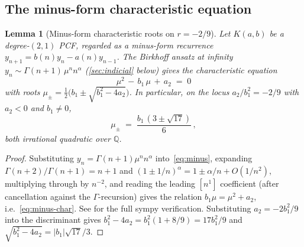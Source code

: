 \documentclass[11pt]{amsart}
\newtheorem{lemma}[theorem]{Lemma}
\theoremstyle{definition}
\theoremstyle{remark}
\newcommand{\Q}{\mathbb{Q}}
\begin{document}
\subsection{The minus-form characteristic equation}

\begin{lemma}[Minus-form characteristic roots on $r=-2/9$]
\label{lem:minus-roots}
Let $K(a,b)$ be a degree-$(2,1)$ PCF, regarded as a minus-form
recurrence $y_{n+1} = b(n)y_n - a(n)y_{n-1}$.  The Birkhoff ansatz at
infinity $y_n \sim \Gamma(n+1)\,\mu^n n^\alpha$
(\textsection\ref{sec:indicial} below) gives the characteristic
equation
\begin{equation}\label{eq:minus-char}
  \mu^2 \,-\, b_1\,\mu \,+\, a_2 \;=\; 0
\end{equation}
with roots $\mu_\pm = \tfrac{1}{2}\bigl(b_1 \pm \sqrt{b_1^2 - 4
a_2}\bigr)$.  In particular, on the locus $a_2/b_1^2 = -2/9$ with
$a_2 < 0$ and $b_1 \ne 0$,
\[
  \mu_\pm \;=\; \frac{b_1\,(3 \pm \sqrt{17})}{6}\,,
\]
both irrational quadratic over $\Q$.
\end{lemma}
\begin{proof}
Substituting $y_n = \Gamma(n+1)\mu^n n^\alpha$ into~\eqref{eq:minus},
expanding $\Gamma(n+2)/\Gamma(n+1) = n+1$ and $(1\pm 1/n)^\alpha
= 1\pm\alpha/n + O(1/n^2)$, multiplying through by $n^{-2}$, and
reading the leading $[n^1]$ coefficient (after cancellation against
the $\Gamma$-recursion) gives the relation $b_1\mu = \mu^2 + a_2$,
i.e.~\eqref{eq:minus-char}.  See \cite[]{SprintW1Report}
for the full sympy verification.  Substituting $a_2 = -2b_1^2/9$ into
the discriminant gives $b_1^2 - 4 a_2 = b_1^2(1 + 8/9) = 17 b_1^2/9$
and $\sqrt{b_1^2-4a_2} = |b_1|\sqrt{17}/3$.
\end{proof}
\end{document}
